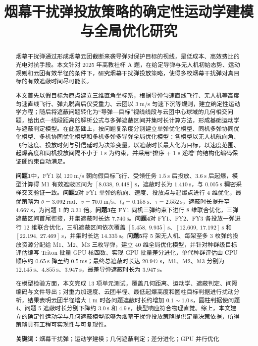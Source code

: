 \documentclass[11pt,a4paper]{ctexart}
\title{{\normalsize\bfseries 烟幕干扰弹投放策略的确定性运动学建模与全局优化研究}}
\author{}
\date{}
\begin{document}
\maketitle
\vspace{-2.8em}

\begin{abstract}
烟幕干扰弹通过形成烟幕云团截断来袭导弹对保护目标的视线，是低成本、高效费比的光电对抗手段。本文针对 2025 年高教社杯 A 题，在给定导弹与无人机初始态势、运动规则和云团有效半径的条件下，研究烟幕干扰弹投放策略，使得多枚烟幕干扰弹对真目标的有效遮蔽时间尽可能长。

本文首先以假目标为原点建立三维直角坐标系，根据导弹匀速直线飞行、无人机等高度匀速直线飞行、弹丸脱离后仅受重力、云团以 $3~\mathrm{m/s}$ 匀速下沉等规则，建立确定性运动学方程；随后将遮蔽问题转化为“导弹—目标”视线线段与云团中心球域的几何相交问题，给出点—线段距离的解析公式与多弹遮蔽区间并集时长计算方法，形成基础运动学与遮蔽判定模型。在此基础上，按问题复杂度分别建立单弹优化模型、同机多弹协同优化模型、多机协同优化模型和多机多弹多导弹全局优化模型：各模型以无人机航向角、飞行速度、投放时刻与引信延时为决策变量，以遮蔽时长最大化为目标，以速度范围、起爆高度和同机投放间隔不小于 $1~\mathrm{s}$ 为约束，并采用“排序 + 1 s 递增”的结构化编码保证硬约束自动满足。

\textbf{问题1}中，FY1 以 $120~\mathrm{m/s}$ 朝向假目标飞行、受领任务 $1.5~\mathrm{s}$ 后投放、$3.6~\mathrm{s}$ 后起爆，模型计算得 M1 有效遮蔽区间为 $[8.038,\ 9.448]~\mathrm{s}$，遮蔽时长为 $1.410~\mathrm{s}$，与 $0.005~\mathrm{s}$ 稠密采样交叉验证一致。\textbf{问题2}对 FY1 单弹的航向、速度、投放点与起爆点进行 4 维优化，最优策略为 $\theta=3.092~\mathrm{rad}$、$v=70.0~\mathrm{m/s}$、$t_d=0.158~\mathrm{s}$、$\tau=2.552~\mathrm{s}$，遮蔽时长提升至 $4.667~\mathrm{s}$，为问题 1 的 $3.31$ 倍。\textbf{问题3}在 FY1 同机三弹约束下进行 8 维联合优化，三弹遮蔽区间首尾衔接，并集遮蔽时长达 $7.740~\mathrm{s}$。\textbf{问题4}对 FY1、FY2、FY3 各投放一弹进行 12 维联合优化，三机遮蔽区间依次覆盖 $[5.458,\ 9.935]~\mathrm{s}$、$[12.609,\ 17.192]~\mathrm{s}$ 和 $[22.194,\ 27.469]~\mathrm{s}$，并集时长达 $14.335~\mathrm{s}$。\textbf{问题5}将 5 架无人机、每架至多 3 枚弹的投放资源分配给 M1、M2、M3 三枚导弹，建立 40 维全局优化模型，并针对种群级目标评估编写 Triton 批量 GPU 核函数、实现 GPU 批量差分进化，单代种群评估由 CPU 顺序约 $0.65~\mathrm{s}$ 降至约 $0.5~\mathrm{ms}$；最终总遮蔽时长达 $20.947~\mathrm{s}$，M1、M2、M3 分别为 $12.145~\mathrm{s}$、$4.855~\mathrm{s}$、$3.947~\mathrm{s}$，最差导弹遮蔽时长为 $3.947~\mathrm{s}$。

在模型检验方面，本文完成 13 项单元测试，覆盖几何距离、运动学、遮蔽判定、间隔编码与文件导出；对重力加速度、云团半径、最低起爆高度和圆柱目标判据进行扰动分析，结果表明云团半径增大 $1~\mathrm{m}$ 时各问题遮蔽时长约增加 $0.1\sim1.0~\mathrm{s}$，圆柱判据使问题 4、问题 5 遮蔽时长分别下降约 $3.0~\mathrm{s}$ 和 $4.9~\mathrm{s}$，模型响应符合物理直觉。综上，本文建立的确定性运动学与几何遮蔽模型能够为烟幕干扰弹投放策略提供定量决策依据，所得策略具有工程可实现性与可复现性。

\vspace{0.5em}
\noindent\textbf{关键词：}烟幕干扰弹；运动学建模；几何遮蔽判定；差分进化；GPU 并行优化
\end{abstract}
\newpage
\end{document}
